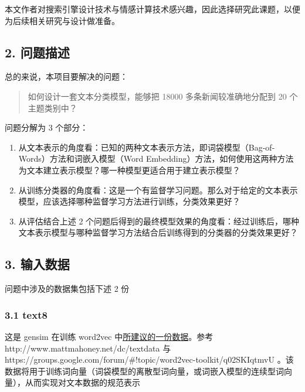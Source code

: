 \documentclass[11pt]{article}
\providecommand{\tightlist}{%
      \setlength{\itemsep}{0pt}\setlength{\parskip}{0pt}}
\begin{document}
本文作者对搜索引擎设计技术与情感计算技术感兴趣，因此选择研究此课题，以便为后续相关研究与设计做准备。

    \subsection{2. 问题描述}\label{ux95eeux9898ux63cfux8ff0}

总的来说，本项目要解决的问题：

\begin{quote}
如何设计一套文本分类模型，能够把 18000 多条新闻较准确地分配到 20
个主题类别中？
\end{quote}

问题分解为 3 个部分：

\begin{enumerate}
\def\labelenumi{\arabic{enumi}.}
\tightlist
\item
  从文本表示的角度看：已知的两种文本表示方法，即词袋模型（Bag-of-Words）方法和词嵌入模型（Word
  Embedding）方法，如何使用这两种方法为文本建立表示模型？哪一种模型更适合用于建立表示模型？
\item
  从训练分类器的角度看：这是一个有监督学习问题。那么对于给定的文本表示模型，应该选择哪种监督学习方法进行训练，分类效果更好？
\item
  从评估结合上述 2
  个问题后得到的最终模型效果的角度看：经过训练后，哪种文本表示模型与哪种监督学习方法结合后训练得到的分类器的分类效果更好？
\end{enumerate}

    \subsection{3. 输入数据}\label{ux8f93ux5165ux6570ux636e}

问题中涉及的数据集包括下述 2 份

\subsubsection{3.1 text8}\label{text8}

这是 gensim 在训练 word2vec
中\href{https://radimrehurek.com/gensim/models/word2vec.html\#gensim.models.word2vec.Text8Corpus}{所建议的一份数据}。参考
http://www.mattmahoney.net/dc/textdata 与
https://groups.google.com/forum/\#!topic/word2vec-toolkit/q02SKIqtmvU
。该数据将用于训练词向量（词袋模型的离散型词向量，或词嵌入模型的连续型词向量），从而实现对文本数据的规范表示
\end{document}
